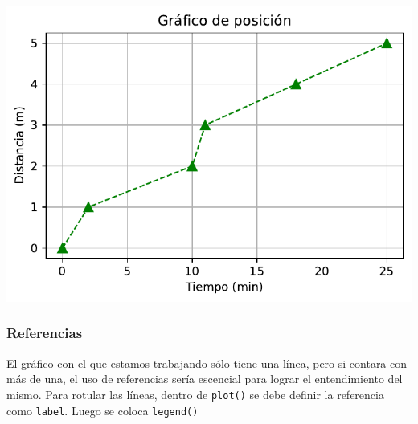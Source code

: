 \documentclass[
  letterpaper,
  DIV=11,
  numbers=noendperiod]{scrreprt}
\begin{document}
\includegraphics{unidad_6_files/figure-pdf/cell-114-output-1.pdf}

\subsubsection{Referencias}\label{referencias}

El gráfico con el que estamos trabajando sólo tiene una línea, pero si
contara con más de una, el uso de referencias sería escencial para
lograr el entendimiento del mismo. Para rotular las líneas, dentro de
\texttt{plot()} se debe definir la referencia como \texttt{label}. Luego
se coloca \texttt{legend()}
\end{document}
